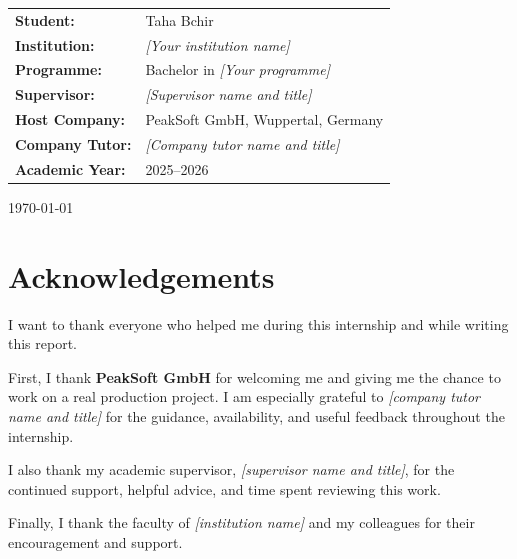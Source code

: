\documentclass[12pt,a4paper]{report}
\begin{document}
{\begin{titlepage}
    \begin{flushleft}
      \renewcommand{\arraystretch}{1.3}
      \begin{tabular}{ll}
        \textbf{Student:}       & Taha Bchir \\
        \textbf{Institution:}   & \emph{[Your institution name]} \\
        \textbf{Programme:}     & Bachelor in \emph{[Your programme]} \\
        \textbf{Supervisor:}    & \emph{[Supervisor name and title]} \\
        \textbf{Host Company:}  & PeakSoft GmbH, Wuppertal, Germany \\
        \textbf{Company Tutor:} & \emph{[Company tutor name and title]} \\
        \textbf{Academic Year:} & 2025--2026 \\
      \end{tabular}
    \end{flushleft}

    \vfill
    {\large \today\par}
  \end{titlepage}
}

\setcounter{page}{1}


\chapter*{Acknowledgements}
{}

I want to thank everyone who helped me during this internship and while writing
this report.

First, I thank \textbf{PeakSoft GmbH} for welcoming me and giving me the chance
to work on a real production project.
I am especially grateful to \emph{[company tutor name and title]} for the guidance,
availability, and useful feedback throughout the internship.

I also thank my academic supervisor, \emph{[supervisor name and title]}, for the
continued support, helpful advice, and time spent reviewing this work.

Finally, I thank the faculty of \emph{[institution name]} and my colleagues for
their encouragement and support.

\clearpage

\end{document}
